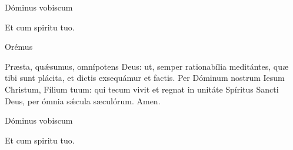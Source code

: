 

\rubric{\Vbar} Dóminus vobiscum

\rubric{\Rbar} Et cum spiritu tuo.

Orémus

Præsta, quǽsumus, omnípotens Deus: ut, semper rationabília meditántes, quæ tibi sunt plácita, et dictis exsequámur et factis. Per Dóminum nostrum Iesum Christum, Fílium tuum: qui tecum vivit et regnat in unitáte Spíritus Sancti Deus, per ómnia sǽcula sæculórum.\rubric{\Rbar} Amen.

\rubric{\Vbar} Dóminus vobiscum

\rubric{\Rbar} Et cum spiritu tuo.
